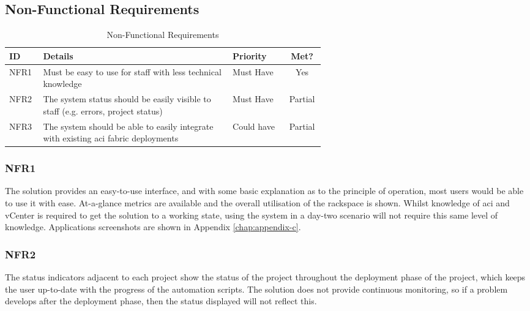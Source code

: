 \subsection{Non-Functional Requirements}

\begin{center}
    \begin{table}[H]
        \begin{tabular}{l p{0.6\linewidth} l c}
            \textbf{ID}             & \textbf{Details}
                                    & \textbf{Priority}
                                    & \textbf{Met?}
            \\ \hline
            NFR1                    & Must be easy to use for staff with less technical
            knowledge
                                    & Must Have
                                    & \cellcolor{green!25}Yes
            \\ \hline
            NFR2                    & The system status should be easily visible to staff (e.g.
            errors, project status) & Must Have
                                    & \cellcolor{yellow!25}Partial
                                                                             \\ \hline
            NFR3                    & The system should be able to easily integrate with existing \gls{aci} fabric deployments & Could have & \cellcolor{yellow!25}Partial
        \end{tabular}
        \caption{Non-Functional Requirements}
        \label{table:evaluation-non-functional-requirements}
    \end{table}
\end{center}

\subsubsection{NFR1}
The solution provides an easy-to-use interface, and with some basic explanation as to the principle of operation, most users would be able to use it with ease. At-a-glance metrics are available and the overall utilisation of the rackspace is shown. Whilst knowledge of \gls{aci} and vCenter is required to get the solution to a working state, using the system in a day-two scenario will not require this same level of knowledge. Applications screenshots are shown in Appendix \ref{chap:appendix-c}.

\subsubsection{NFR2}
The status indicators adjacent to each project show the status of the project throughout the deployment phase of the project, which keeps the user up-to-date with the progress of the automation scripts. The solution does not provide continuous monitoring, so if a problem develops after the deployment phase, then the status displayed will not reflect this.

